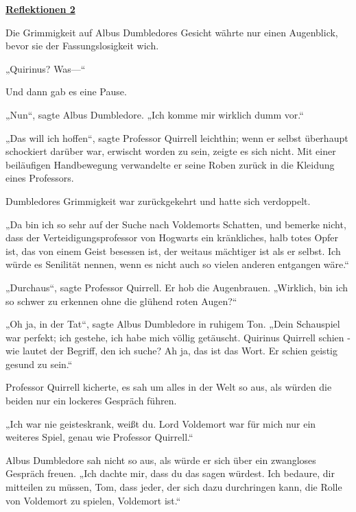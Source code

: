 

\hypertarget{reflektionen-2}{%

\textbf{\uline{Reflektionen 2}}

Die Grimmigkeit auf Albus Dumbledores Gesicht währte nur einen Augenblick, bevor sie der Fassungslosigkeit wich.

„Quirinus? Was—“

Und dann gab es eine Pause.

„Nun“, sagte Albus Dumbledore. „Ich komme mir wirklich dumm vor.“

„Das will ich hoffen“, sagte Professor Quirrell leichthin; wenn er selbst überhaupt schockiert darüber war, erwischt worden zu sein, zeigte es sich nicht. Mit einer beiläufigen Handbewegung verwandelte er seine Roben zurück in die Kleidung eines Professors.

Dumbledores Grimmigkeit war zurückgekehrt und hatte sich verdoppelt.

„Da bin ich so sehr auf der Suche nach Voldemorts Schatten, und bemerke nicht, dass der Verteidigungsprofessor von Hogwarts ein kränkliches, halb totes Opfer ist, das von einem Geist besessen ist, der weitaus mächtiger ist als er selbst. Ich würde es Senilität nennen, wenn es nicht auch so vielen anderen entgangen wäre.“

„Durchaus“, sagte Professor Quirrell. Er hob die Augenbrauen. „Wirklich, bin ich so schwer zu erkennen ohne die glühend roten Augen?“

„Oh ja, in der Tat“, sagte Albus Dumbledore in ruhigem Ton. „Dein Schauspiel war perfekt; ich gestehe, ich habe mich völlig getäuscht. Quirinus Quirrell schien - wie lautet der Begriff, den ich suche? Ah ja, das ist das Wort. Er schien geistig gesund zu sein.“

Professor Quirrell kicherte, es sah um alles in der Welt so aus, als würden die beiden nur ein lockeres Gespräch führen.

„Ich war nie geisteskrank, weißt du. Lord Voldemort war für mich nur ein weiteres Spiel, genau wie Professor Quirrell.“

Albus Dumbledore sah nicht so aus, als würde er sich über ein zwangloses Gespräch freuen. „Ich dachte mir, dass du das sagen würdest. Ich bedaure, dir mitteilen zu müssen, Tom, dass jeder, der sich dazu durchringen kann, die Rolle von Voldemort zu spielen, Voldemort ist.“

}
